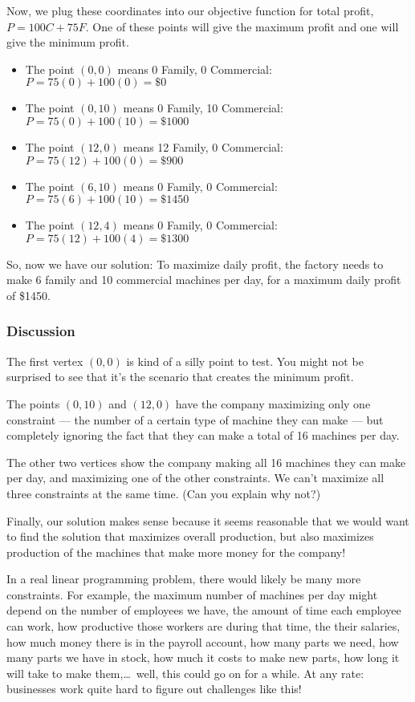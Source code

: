 Now, we plug these coordinates into our objective function for total profit, $P = 100C + 75F$. One of these points will give the maximum profit and one will give the minimum profit.
\begin{itemize}
\item The point $(0,0)$ means 0 Family, 0 Commercial: $P = 75(0) + 100(0) = \$0$

\item The point $(0,10)$ means 0 Family, 10 Commercial: $P = 75(0) + 100(10) = \$1000$

\item The point $(12,0)$ means 12 Family, 0 Commercial: $P = 75(12) + 100(0) = \$900$

\item The point $(6,10)$ means 0 Family, 0 Commercial: $P = 75(6) + 100(10) = \$1450$

\item The point $(12,4)$ means 0 Family, 0 Commercial: $P = 75(12) + 100(4) = \$1300$
\end{itemize}
So, now we have our solution: To maximize daily profit, the factory needs to make 6 family and 10 commercial machines per day, for a maximum daily profit of \$1450.

 \subsubsection{Discussion}

The first vertex $(0,0)$ is kind of a silly point to test. You might not be surprised to see that it's the scenario that creates the minimum profit.

The points $(0, 10)$ and $(12, 0)$ have the company maximizing only one constraint --- the number of a certain type of machine they can make --- but completely ignoring the fact that they can make a total of 16 machines per day.

The other two vertices show the company making all 16 machines they can make per day, and maximizing one of the other constraints. We can't maximize all three constraints at the same time. (Can you explain why not?)

Finally, our solution makes sense because it seems reasonable that we would want to find the solution that maximizes overall production, but also maximizes production of the machines that make more money for the company!

In a real linear programming problem, there would likely be many more constraints. For example, the maximum number of machines per day might depend on the number of employees we have, the amount of time each employee can work, how productive those workers are during that time, the their salaries, how much money there is in the payroll account, how many parts we need, how many parts we have in stock, how much it costs to make new parts, how long it will take to make them,\ldots\ well, this could go on for a while. At any rate: businesses work quite hard to figure out challenges like this!


